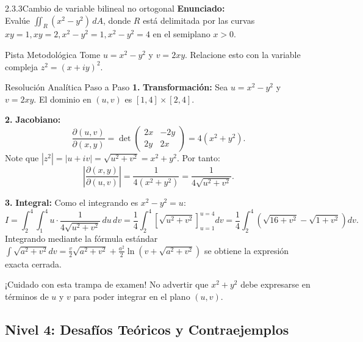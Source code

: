 \documentclass[11pt,a4paper]{article}
\begin{document}
\begin{nivelbox}{2.3.3}{Cambio de variable bilineal no ortogonal}
\textbf{Enunciado:}\\
Evalúe $\iint_R (x^2 - y^2) \, dA$, donde $R$ está delimitada por las curvas $xy = 1, xy = 2, x^2 - y^2 = 1, x^2 - y^2 = 4$ en el semiplano $x > 0$.

\begin{observacionbox}{Pista Metodológica}
Tome $u = x^2 - y^2$ y $v = 2xy$. Relacione esto con la variable compleja $z^2 = (x+iy)^2$.
\end{observacionbox}

\begin{ejerciciobox}{Resolución Analítica Paso a Paso}
\smallskip\noindent\textbf{1.} \textbf{Transformación:}
Sea $u = x^2 - y^2$ y $v = 2xy$. El dominio en $(u,v)$ es $[1, 4] \times [2, 4]$.

\smallskip\noindent\textbf{2.} \textbf{Jacobiano:}
\[\frac{\partial(u,v)}{\partial(x,y)} = \det \begin{pmatrix} 2x & -2y \\ 2y & 2x \end{pmatrix} = 4(x^2 + y^2).\]
Note que $|z^2| = |u + iv| = \sqrt{u^2 + v^2} = x^2 + y^2$. Por tanto:
\[\left| \frac{\partial(x,y)}{\partial(u,v)} \right| = \frac{1}{4(x^2 + y^2)} = \frac{1}{4\sqrt{u^2 + v^2}}.\]

\smallskip\noindent\textbf{3.} \textbf{Integral:}
Como el integrando es $x^2 - y^2 = u$:
\[I = \int_2^4 \int_1^4 u \cdot \frac{1}{4\sqrt{u^2 + v^2}} \, du \, dv = \frac{1}{4} \int_2^4 \left[ \sqrt{u^2 + v^2} \right]_{u=1}^{u=4} dv = \frac{1}{4} \int_2^4 \left( \sqrt{16 + v^2} - \sqrt{1 + v^2} \right) dv.\]
Integrando mediante la fórmula estándar $\int \sqrt{a^2 + v^2} dv = \frac{v}{2}\sqrt{a^2+v^2} + \frac{a^2}{2}\ln(v + \sqrt{a^2+v^2})$ se obtiene la expresión exacta cerrada.
\end{ejerciciobox}

\begin{errorbox}{¡Cuidado con esta trampa de examen!}
No advertir que $x^2+y^2$ debe expresarse en términos de $u$ y $v$ para poder integrar en el plano $(u,v)$.
\end{errorbox}
\end{nivelbox}
\bigskip

\subsection{Nivel 4: Desafíos Teóricos y Contraejemplos}
\end{document}
